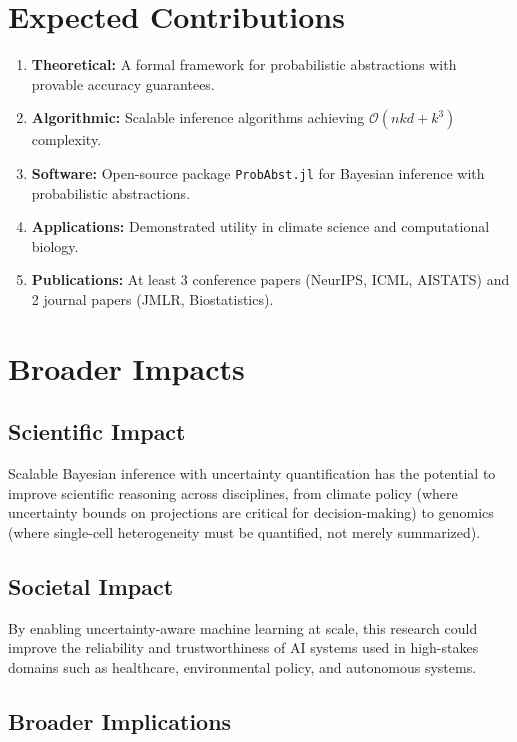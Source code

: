 \documentclass[
    language=english,
    doctype=dissertation-proposal,
    institution=none,
]{../../omnilatex}
\begin{document}
\section{Expected Contributions}
\label{sec:contributions}

\begin{enumerate}
    \item \textbf{Theoretical:} A formal framework for probabilistic
          abstractions with provable accuracy guarantees.
    \item \textbf{Algorithmic:} Scalable inference algorithms achieving
          $\mathcal{O}(nkd + k^3)$ complexity.
    \item \textbf{Software:} Open-source package \texttt{ProbAbst.jl}
          for Bayesian inference with probabilistic abstractions.
    \item \textbf{Applications:} Demonstrated utility in climate science
          and computational biology.
    \item \textbf{Publications:} At least 3 conference papers (NeurIPS,
          ICML, AISTATS) and 2 journal papers (JMLR, Biostatistics).
\end{enumerate}

\section{Broader Impacts}
\label{sec:broader-impacts}

\subsection{Scientific Impact}

Scalable Bayesian inference with uncertainty quantification has the
potential to improve scientific reasoning across disciplines, from climate
policy (where uncertainty bounds on projections are critical for
decision-making) to genomics (where single-cell heterogeneity must be
quantified, not merely summarized).

\subsection{Societal Impact}

By enabling uncertainty-aware machine learning at scale, this research
could improve the reliability and trustworthiness of AI systems used in
high-stakes domains such as healthcare, environmental policy, and
autonomous systems.

\subsection{Broader Implications}
\end{document}
